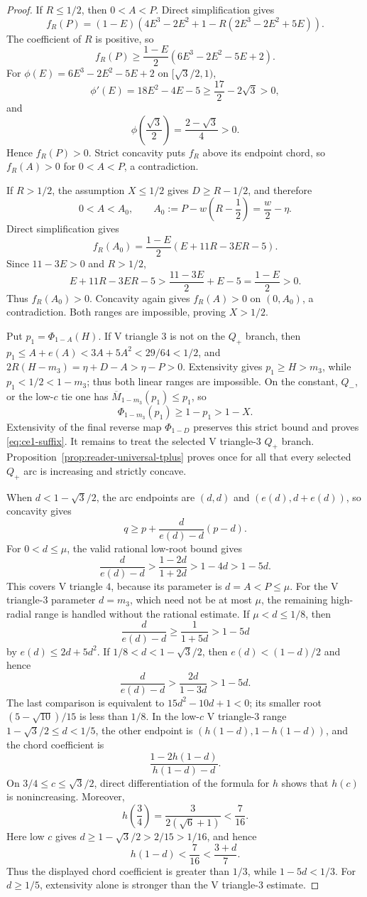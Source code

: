 \begin{proof}
If $R\le1/2$, then $0<A<P$.  Direct simplification gives
\[
 f_R(P)
 =(1-E)\left(
 4E^3-2E^2+1-R(2E^3-2E^2+5E)
 \right).
\]
The coefficient of $R$ is positive, so
\[
 f_R(P)\ge
 \frac{1-E}{2}\left(6E^3-2E^2-5E+2\right).
\]
For $\phi(E)=6E^3-2E^2-5E+2$ on
$[\sqrt3/2,1)$,
\[
 \phi'(E)=18E^2-4E-5
 \ge\frac{17}{2}-2\sqrt3>0,
\]
and
\[
 \phi\left(\frac{\sqrt3}{2}\right)
 =\frac{2-\sqrt3}{4}>0.
\]
Hence $f_R(P)>0$.  Strict concavity puts $f_R$ above its endpoint chord,
so $f_R(A)>0$ for $0<A<P$, a contradiction.

If $R>1/2$, the assumption $X\le1/2$ gives
$D\ge R-1/2$, and therefore
\[
 0<A<A_0,
 \qquad
 A_0:=P-w\left(R-\frac12\right)=\frac w2-\eta.
\]
Direct simplification gives
\[
 f_R(A_0)
 =\frac{1-E}{2}(E+11R-3ER-5).
\]
Since $11-3E>0$ and $R>1/2$,
\[
 E+11R-3ER-5
 >\frac{11-3E}{2}+E-5
 =\frac{1-E}{2}>0.
\]
Thus $f_R(A_0)>0$.  Concavity again gives $f_R(A)>0$ on $(0,A_0)$, a
contradiction.  Both ranges are impossible, proving $X>1/2$.

Put $p_1=\Phi_{1-A}(H)$.  If V triangle $3$ is not on the $Q_+$ branch, then
$p_1\le A+e(A)<3A+5A^2<29/64<1/2$, and
$2R(H-m_3)=\eta+D-A>\eta-P>0$.  Extensivity gives
$p_1\ge H>m_3$, while $p_1<1/2<1-m_3$; thus both linear ranges are impossible.
On the constant, $Q_-$, or the low-$c$ tie one has $\overline M_{1-m_3}(p_1)\le p_1$, so
\[
 \Phi_{1-m_3}(p_1)\ge1-p_1>1-X.
\]
Extensivity of the final reverse map $\Phi_{1-D}$ preserves this strict bound
and proves \eqref{eq:ce1-suffix}.  It remains to treat the selected V triangle-$3$
$Q_+$ branch.  Proposition~\ref{prop:reader-universal-tplus} proves once
for all that every selected $Q_+$ arc is increasing and strictly concave.

When $d<1-\sqrt3/2$, the arc endpoints are
$(d,d)$ and $(e(d),d+e(d))$, so concavity gives
\begin{equation}
 q\ge p+\frac{d}{e(d)-d}(p-d).
 \label{eq:ce1-selected-chord}
\end{equation}
For $0<d\le\mu$, the valid rational low-root bound gives
\[
 \frac{d}{e(d)-d}>\frac{1-2d}{1+2d}>1-4d>1-5d.
\]
This covers V triangle $4$, because its parameter is $d=A<P\le\mu$.  For the
V triangle-$3$ parameter $d=m_3$, which need not be at most $\mu$, the remaining
high-radial range is handled without the rational estimate.  If
$\mu<d\le1/8$, then
\[
 \frac{d}{e(d)-d}\ge\frac1{1+5d}>1-5d
\]
by $e(d)\le2d+5d^2$.  If
$1/8<d<1-\sqrt3/2$, then $e(d)<(1-d)/2$ and hence
\[
 \frac{d}{e(d)-d}>\frac{2d}{1-3d}>1-5d.
\]
The last comparison is equivalent to $15d^2-10d+1<0$; its smaller root
$(5-\sqrt{10})/15$ is less than $1/8$.  In the low-$c$ V triangle-$3$ range
$1-\sqrt3/2\le d<1/5$, the other endpoint is
$(h(1-d),1-h(1-d))$, and the chord coefficient is
\[
 \frac{1-2h(1-d)}{h(1-d)-d}.
\]
On $3/4\le c\le\sqrt3/2$, direct differentiation of the formula for $h$
shows that $h(c)$ is nonincreasing.  Moreover,
\[
 h\left(\frac34\right)
 =\frac{3}{2(\sqrt6+1)}<\frac7{16}.
\]
Here low $c$ gives $d\ge1-\sqrt3/2>2/15>1/16$, and hence
\[
 h(1-d)<\frac7{16}<\frac{3+d}{7}.
\]
Thus the displayed chord coefficient is greater than $1/3$, while
$1-5d<1/3$.
For $d\ge1/5$, extensivity alone is stronger than the V triangle-$3$ estimate.


\end{proof}
